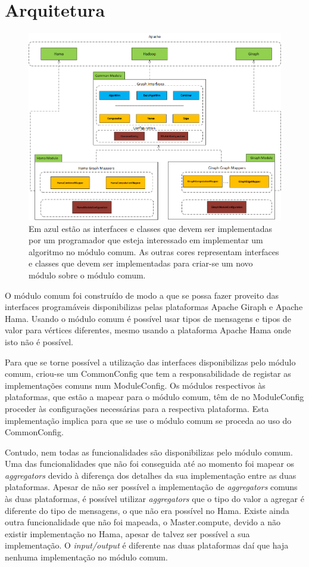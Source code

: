 \chapter{Arquitetura}
\begin{figure}[H]
	\centering
		\includegraphics[width=\linewidth]{arquitetura}
	\caption{Em azul estão as interfaces e classes que devem ser implementadas por um programador que esteja interessado em implementar um algoritmo no módulo comum. As outras cores representam interfaces e classes que devem ser implementadas para criar-se um novo módulo sobre o módulo comum.}
	\label{fig:arquitetura}
\end{figure}

O módulo comum foi construído de modo a que se possa fazer proveito das interfaces programáveis disponibilizas pelas plataformas Apache Giraph e Apache Hama. Usando o módulo comum é possível usar tipos de mensagens e tipos de valor para vértices diferentes, mesmo usando a plataforma Apache Hama onde isto não é possível.

Para que se torne possível a utilização das interfaces disponibilizas pelo módulo comum, criou-se um CommonConfig que tem a responsabilidade de registar as implementações comuns num ModuleConfig. Os módulos respectivos às plataformas, que estão a mapear para o módulo comum, têm de no ModuleConfig proceder às configurações necessárias para a respectiva plataforma. Esta implementação implica para que se use o módulo comum se proceda ao uso do CommonConfig.

Contudo, nem todas as funcionalidades são disponibilizas pelo módulo comum. Uma das funcionalidades que não foi conseguida até ao momento foi mapear os \textit{aggregators} devido à diferença dos detalhes da sua implementação entre as duas plataformas. Apesar de não ser possível a implementação de \textit{aggregators} comuns às duas plataformas, é possível utilizar \textit{aggregators} que o tipo do valor a agregar é diferente do tipo de mensagens, o que não era possível no Hama. Existe ainda outra funcionalidade que não foi mapeada, o Master.compute, devido a não existir implementação no Hama, apesar de talvez ser  possível a sua implementação. O \textit{input/output} é diferente nas duas plataformas daí que haja nenhuma implementação no módulo comum.